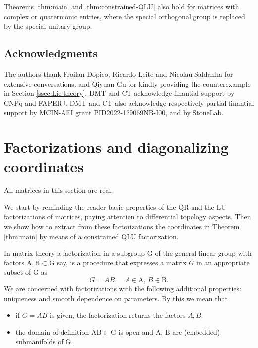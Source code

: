 \documentclass[reqno]{amsart}
\renewcommand{\L}{\mathrm{L}}
\newcommand{\U}{\mathrm{U}}
\theoremstyle{definition} %
\begin{document}
Theorems \ref{thm:main} and \ref{thm:constrained-QLU} also hold for matrices  with complex or quaternionic entries, where the special orthogonal group is replaced by the special unitary group.


\subsection*{ Acknowledgments} The authors thank Froilan Dopico, Ricardo Leite and Nicolau Saldanha for extensive conversations,  and Qiyuan Gu for kindly providing  the counterexample in Section \ref{ssec:Lie-theory}. DMT and CT acknowledge  finantial support by CNPq and FAPERJ. DMT and CT also acknowledge respectively partial finantial support  by MCIN-AEI grant PID2022-139069NB-I00, and by StoneLab.


\section{Factorizations and diagonalizing coordinates}\label{sec:cx}

All matrices in this section are real.

We start by reminding the reader basic properties of the $\mathrm{QR}$ and the $\L\U$ factorizations of matrices, paying attention to  differential topology aspects.
Then we show how to extract from these factorizations the coordinates in Theorem \ref{thm:main} by means of a constrained $\mathrm{Q}\L\U$ factorization.


\medskip


 In  matrix theory a factorization in a subgroup $\mathrm{G}$ of the general linear group with factors $\mathrm{A},\mathrm{B}\subset \mathrm{G}$ say,  is
 a procedure that expresses a matrix $G$ in an appropriate subset of $\mathrm{G}$ as
 \[G=AB,\quad A\in \mathrm{A},\,B\in \mathrm{B}.\]
We are concerned with factorizations with the following additional properties: uniqueness and smooth dependence on parameters. By this we mean that
 \begin{itemize}
  \item  if $G=AB$ is given, the factorization returns the factors $A,B$;
  \item the domain of definition $\mathrm{AB}\subset \mathrm{G}$ is open and $\mathrm{A}$, $\mathrm{B}$ are (embedded) submanifolds of $\mathrm{G}$.
 \end{itemize}
\end{document}
